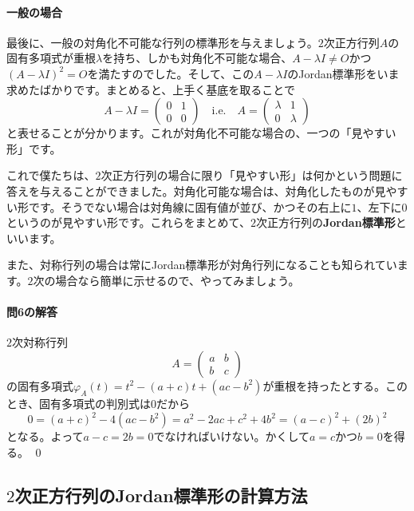 \paragraph{一般の場合}

最後に、一般の対角化不可能な行列の標準形を与えましょう。$2$次正方行列$A$の固有多項式が重根$\lambda$を持ち、しかも対角化不可能な場合、$A - \lambda I \neq O$かつ$(A - \lambda I)^2 = O$を満たすのでした。そして、この$A - \lambda I$のJordan標準形をいま求めたばかりです。まとめると、上手く基底を取ることで
\[
A - \lambda I = 
\begin{pmatrix}
0 & 1 \\
0 & 0
\end{pmatrix}
\quad \text{i.e.} \quad
A =
\begin{pmatrix}
\lambda & 1 \\
0 & \lambda
\end{pmatrix}
\]
と表せることが分かります。これが対角化不可能な場合の、一つの「見やすい形」です。

これで僕たちは、$2$次正方行列の場合に限り「見やすい形」は何かという問題に答えを与えることができました。対角化可能な場合は、対角化したものが見やすい形です。そうでない場合は対角線に固有値が並び、かつその右上に$1$、左下に$0$というのが見やすい形です。これらをまとめて、$2$次正方行列の\textbf{Jordan標準形}といいます。

また、対称行列の場合は常にJordan標準形が対角行列になることも知られています。$2$次の場合なら簡単に示せるので、やってみましょう。

\paragraph{問6の解答}

$2$次対称行列
\[
A = 
\begin{pmatrix}
a & b \\
b & c
\end{pmatrix}
\]
の固有多項式$\varphi_A(t) = t^2 - (a + c)t + (ac - b^2)$が重根を持ったとする。このとき、固有多項式の判別式は$0$だから
\[
0 = (a + c)^2 - 4(ac - b^2) = a^2 - 2ac + c^2 + 4b^2 = (a - c)^2 + (2b)^2
\]
となる。よって$a - c = 2b = 0$でなければいけない。かくして$a = c$かつ$b = 0$を得る。 \qed

\subsection{$2$次正方行列のJordan標準形の計算方法}


